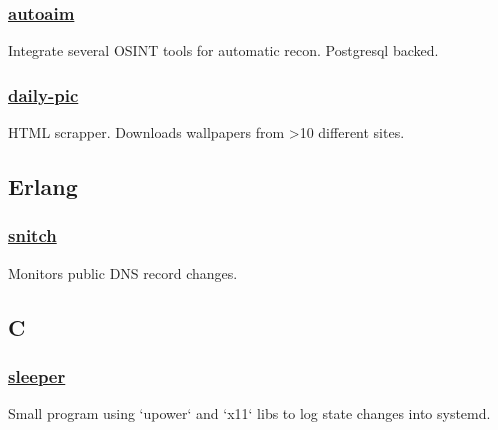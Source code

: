 \documentclass[11pt]{article}
\newcommand{\git}[2]{\href {https://github.com/azimut/{#2}} {#1}}
\begin{document}
\subsubsection{\git{autoaim}{autoaim}}
Integrate several OSINT tools for automatic recon. Postgresql backed.
\subsubsection{\git{daily-pic}{daily-pic}}
HTML scrapper. Downloads wallpapers from >10 different sites.

\subsection{Erlang}
\subsubsection{\git{snitch}{snitch}}
Monitors public DNS record changes.

\subsection{C}
\subsubsection{\git{sleeper}{sleeper}}
Small program using `upower` and `x11` libs to log state changes into systemd.
\end{document}
